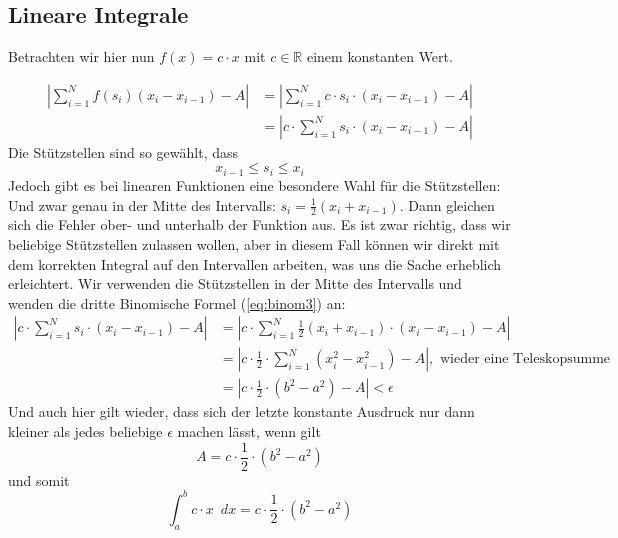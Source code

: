 \subsection{Lineare Integrale}

Betrachten wir hier nun $f(x) = c\cdot x$ mit $c\in \mathbb{R}$ einem konstanten Wert. 

\begin{equation}
\begin{split}
\left| \sum_{i=1}^{N} f(s_i)(x_{i}-x_{i-1}) -A \right| &= \left| \sum_{i=1}^{N} c\cdot s_i \cdot (x_{i}-x_{i-1}) -A \right| \\ 
&=\left|  c\cdot \sum_{i=1}^{N}s_i \cdot (x_{i}-x_{i-1}) -A \right|
\end{split}
\end{equation}
Die Stützstellen sind so gewählt, dass
\begin{equation}
x_{i-1} \le s_i \le x_{i}
\end{equation}
Jedoch gibt es bei linearen Funktionen eine besondere Wahl für die Stützstellen: Und zwar genau in der Mitte des Intervalls: $s_i = \frac{1}{2}(x_{i}+x_{i-1})$. Dann gleichen sich die Fehler ober- und unterhalb der Funktion aus. Es ist zwar richtig, dass wir beliebige Stützstellen zulassen wollen, aber in diesem Fall können wir direkt mit dem korrekten Integral auf den Intervallen arbeiten, was uns die Sache erheblich erleichtert. Wir verwenden die Stützstellen in der Mitte des Intervalls und wenden die dritte Binomische Formel (\ref{eq:binom3}) an:
\begin{equation}
\begin{split}
\left|  c\cdot \sum_{i=1}^{N}s_i \cdot (x_{i}-x_{i-1}) -A \right| &= \left|  c\cdot \sum_{i=1}^{N} \frac{1}{2}(x_{i}+x_{i-1}) \cdot (x_{i}-x_{i-1}) -A \right|\\
&=\left|  c\cdot \frac{1}{2} \cdot \sum_{i=1}^{N} (x_{i}^2-x_{i-1}^2) -A \right|, \text{ wieder eine Teleskopsumme}\\
&=\left|  c\cdot \frac{1}{2} \cdot (b^2-a^2) -A \right| < \epsilon
\end{split}
\end{equation}
Und auch hier gilt wieder, dass sich der letzte konstante Ausdruck nur dann kleiner als jedes beliebige $\epsilon$ machen lässt, wenn gilt
\begin{equation}
A = c\cdot \frac{1}{2} \cdot (b^2-a^2)
\end{equation}
und somit
\begin{equation}
\int_a^b c\cdot x \enspace dx = c\cdot \frac{1}{2} \cdot (b^2-a^2)
\end{equation}


